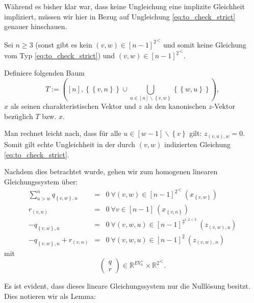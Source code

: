 \documentclass[10p,a4paper,BCOR = 12mm, DIV=15]{scrbook}
\begin{document}
Während es bisher klar war, dass keine Ungleichung eine implizite Gleichheit impliziert, müssen wir hier in Bezug auf Ungleichung \eqref{eq:to_check_strict} genauer hinschauen.

Sei $n \geq 3$ (sonst gibt es kein $\left(v, w\right)\in {[n-1]^{\underline{2}}}^<$ und somit keine Gleichung vom Typ \eqref{eq:to_check_strict}) und $\left(v, w\right)\in {[n-1]^{\underline{2}}}^<$.

Definiere folgenden Baum
\begin{displaymath}
T := \left(\left[n\right], \left\{ \left\{v, n\right\} \right\} \cup \bigcup_{u \in \left[n\right] \backslash \left\{v, w\right\}} \left\{\left\{w, u\right\}\right\} \right),
\end{displaymath}
$x$ als seinen charakteristischen Vektor und $z$ als den kanonischen $z$-Vektor bezüglich $T$ bzw. $x$.

Man rechnet leicht nach, dass für alle $u\in[w-1]\backslash\left\{v\right\}$ gilt: $z_{\left(v, u\right), w} = 0$. Somit gilt echte Ungleichheit in der durch $\left(v, w\right)$ indizierten Gleichung \eqref{eq:to_check_strict}.

Nachdem dies betrachtet wurde, gehen wir zum homogenen linearen Gleichungssystem über:
\begin{eqnarray*}
\sum_{u > w}^n q_{\left\{v, w\right\}, u} & = & 0\ \forall \left(v, w\right)\in {[n-1]^{\underline{2}}}^<\ \left(x_{\left\{v, w\right\}}\right) \\
r_{\left(v, n\right)} & = & 0\ \forall v \in [n-1]\ \left(x_{\left\{v, n\right\}}\right) \\
-q_{\left\{v, w\right\}, u} & = & 0\ \forall \left(v, w, u\right)\in [n-1]^{\underline{3}^{1,2<3}} \ \left(z_{\left(v, w\right), u}\right) \\
-q_{\left\{v, w\right\}, n} + r_{\left(v, n\right)} & = & 0\ \forall \left(v, w, u\right)\in [n-1]^{\underline{2}} \ \left(z_{\left(v, w\right), n}\right)
\end{eqnarray*}
mit
\begin{displaymath}
\left(\begin{array}{c}
q \\
r
\end{array}\right) \in 
\mathbb{R}^{EV_n^{<}}\times {\mathbb{R}^{\underline{2}}}^<.
\end{displaymath}

Es ist evident, dass dieses lineare Gleichungssystem nur die Nulllösung besitzt. Dies notieren wir als Lemma:
\end{document}
